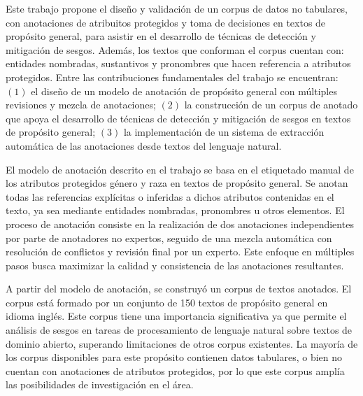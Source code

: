 \begin{conclusions}
    Este trabajo propone el dise\~no y validaci\'on de un corpus de datos no tabulares, con anotaciones de atribuitos
    protegidos y toma de decisiones en textos de prop\'osito general, para asistir en el desarrollo de t\'ecnicas de 
    detecci\'on y mitigaci\'on de sesgos. Adem\'as, los textos que conforman el corpus cuentan con: 
    entidades nombradas, sustantivos y pronombres que hacen referencia a atributos protegidos.
    Entre las contribuciones fundamentales del trabajo se encuentran: $(1)$ el 
    dise\~no de un modelo de anotaci\'on de prop\'osito general con m\'ultiples revisiones y mezcla de anotaciones;
    $(2)$ la construcci\'on de un corpus de anotado que apoya el desarrollo de t\'ecnicas de detecci\'on y mitigaci\'on
    de sesgos en textos de prop\'osito general; $(3)$ la implementaci\'on de un sistema de extracci\'on autom\'atica 
    de las anotaciones desde textos del lenguaje natural.

    El modelo de anotaci\'on descrito en el trabajo se basa en el etiquetado manual de los atributos protegidos g\'enero 
    y raza en textos de prop\'osito general. Se anotan todas las referencias expl\'icitas o inferidas a dichos 
    atributos contenidas en el texto, ya sea mediante entidades nombradas, pronombres u otros elementos. El proceso
    de anotaci\'on consiste en la realizaci\'on de dos anotaciones independientes por parte de anotadores no expertos,
    seguido de una mezcla autom\'atica con resoluci\'on de conflictos y revisi\'on final por un experto. Este enfoque en m\'ultiples 
    pasos busca maximizar la calidad y consistencia de las anotaciones resultantes.

    A partir del modelo de anotaci\'on, se construy\'o un corpus de textos anotados. El corpus est\'a formado por un 
    conjunto de 150 textos de prop\'osito general en idioma ingl\'es. Este corpus tiene una importancia significativa
    ya que permite el an\'alisis de sesgos en tareas de procesamiento de lenguaje natural sobre textos de dominio abierto, 
    superando limitaciones de otros corpus existentes. La mayor\'ia de los corpus disponibles para este prop\'osito
    contienen datos tabulares, o bien no cuentan con anotaciones de atributos protegidos, por lo que este corpus 
    ampl\'ia las posibilidades de investigaci\'on en el \'area.
    

\end{conclusions}
